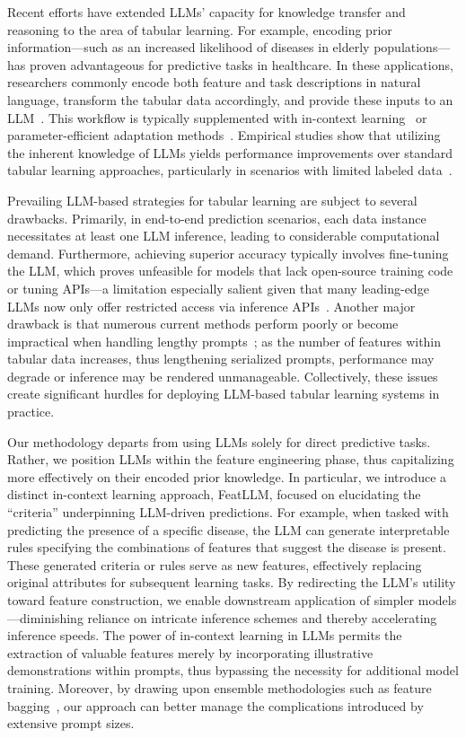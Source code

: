 Recent efforts have extended LLMs’ capacity for knowledge transfer and reasoning to the area of tabular learning. For example, encoding prior information—such as an increased likelihood of diseases in elderly populations—has proven advantageous for predictive tasks in healthcare. In these applications, researchers commonly encode both feature and task descriptions in natural language, transform the tabular data accordingly, and provide these inputs to an LLM~\cite{dinh2022lift,wang2023anypredict}. This workflow is typically supplemented with in-context learning~\cite{nam2023semi} or parameter-efficient adaptation methods~\cite{dinh2022lift,hegselmann2023tabllm}. Empirical studies show that utilizing the inherent knowledge of LLMs yields performance improvements over standard tabular learning approaches, particularly in scenarios with limited labeled data~\cite{hegselmann2023tabllm}.

Prevailing LLM-based strategies for tabular learning are subject to several drawbacks. Primarily, in end-to-end prediction scenarios, each data instance necessitates at least one LLM inference, leading to considerable computational demand. Furthermore, achieving superior accuracy typically involves fine-tuning the LLM, which proves unfeasible for models that lack open-source training code or tuning APIs—a limitation especially salient given that many leading-edge LLMs now only offer restricted access via inference APIs~\cite{anil2023palm,openai2023gpt4}. Another major drawback is that numerous current methods perform poorly or become impractical when handling lengthy prompts~\cite{liu2023lost}; as the number of features within tabular data increases, thus lengthening serialized prompts, performance may degrade or inference may be rendered unmanageable. Collectively, these issues create significant hurdles for deploying LLM-based tabular learning systems in practice.

Our methodology departs from using LLMs solely for direct predictive tasks. Rather, we position LLMs within the feature engineering phase, thus capitalizing more effectively on their encoded prior knowledge. In particular, we introduce a distinct in-context learning approach, \textsf{FeatLLM}, focused on elucidating the “criteria” underpinning LLM-driven predictions. For example, when tasked with predicting the presence of a specific disease, the LLM can generate interpretable rules specifying the combinations of features that suggest the disease is present. These generated criteria or rules serve as new features, effectively replacing original attributes for subsequent learning tasks. By redirecting the LLM’s utility toward feature construction, we enable downstream application of simpler models—diminishing reliance on intricate inference schemes and thereby accelerating inference speeds. The power of in-context learning in LLMs permits the extraction of valuable features merely by incorporating illustrative demonstrations within prompts, thus bypassing the necessity for additional model training. Moreover, by drawing upon ensemble methodologies such as feature bagging~\cite{breiman2001random}, our approach can better manage the complications introduced by extensive prompt sizes.

